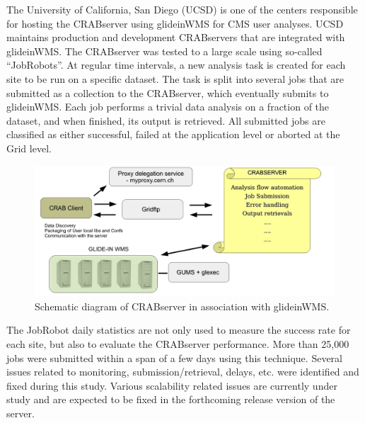 \documentclass[a4paper]{jpconf}
\begin{document}
The University of California, San Diego (UCSD) is one of the centers responsible for hosting 
the CRABserver using glideinWMS for CMS user analyses. UCSD maintains production and development CRABservers 
that are integrated with glideinWMS. The CRABserver was tested to a large 
scale using so-called ``JobRobots''. 
At regular time intervals, a new analysis task is created 
for each site to be run on a specific dataset. The
task is split into several jobs that are submitted as a collection to
the CRABserver, which eventually submits to glideinWMS. Each job
performs a trivial data analysis on a fraction of the dataset, and when
finished, its output is retrieved. All submitted jobs are classified
as either successful, failed at the application level or aborted at the Grid
level.
\begin{figure}
\begin{center}
\includegraphics[scale=0.4]{crabserver}
\end{center}
\caption{Schematic diagram of CRABserver in association with glideinWMS.}
\label{fig:crabserver}
\end{figure}
The JobRobot daily statistics are not only used to measure the success rate for each site, 
but also to evaluate the CRABserver performance. More than 25,000 jobs were submitted within a span of a 
few days using this technique. Several issues related to monitoring, 
submission/retrieval, delays, etc. were identified and fixed during this study. Various scalability
related issues are currently under study and are expected to be fixed in the forthcoming
release version of the server.
\end{document}
